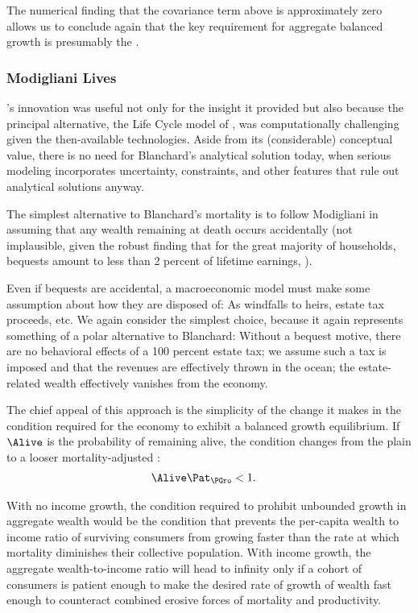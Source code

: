 \documentclass[BufferStockTheory]{subfiles}
\begin{document}
The numerical finding that the covariance term above is approximately zero allows us to conclude again that the key requirement for aggregate balanced growth is presumably the {\GICRaw}.

\hypertarget{Modigliani-Lives}{}
\subsubsection{Modigliani Lives}

\cite{blanchardFinite}'s innovation was useful not only for the insight it provided but also because the principal alternative, the Life Cycle model of \cite{modiglianiWealth}, was computationally challenging given the then-available technologies. Aside from its (considerable) conceptual value, there is no need for Blanchard's analytical solution today, when serious modeling incorporates uncertainty, constraints, and other features that rule out analytical solutions anyway.  %

The simplest alternative to Blanchard's mortality is to follow Modigliani in assuming that any wealth remaining at death occurs accidentally (not implausible, given the robust finding that for the great majority of households, bequests amount to less than 2 percent of lifetime earnings, \cite{hendricksBequests,hendricksSmallBequests}).

Even if bequests are accidental, a macroeconomic model must make some assumption about how they are disposed of: As windfalls to heirs, estate tax proceeds, etc. We again consider the simplest choice, because it again represents something of a polar alternative to Blanchard: Without a bequest motive, there are no behavioral effects of a 100 percent estate tax; we assume such a tax is imposed and that the revenues are effectively thrown in the ocean; the estate-related wealth effectively vanishes from the economy.

The chief appeal of this approach is the simplicity of the change it makes in the condition required for the economy to exhibit a balanced growth equilibrium.  If $\Alive$ is the probability of remaining alive, the condition changes from the plain {\GIC} to a looser mortality-adjusted {\GIC}:
\hypertarget{GICMrt}{}
\begin{align}
  \Alive  \Pat_{\PGro} & < 1. \label{eq:GICMrt}
\end{align}

With no income growth, the condition required to prohibit unbounded growth in aggregate wealth would be the condition that prevents the per-capita wealth to income ratio of surviving consumers from growing faster than the rate at which mortality diminishes their collective population.  With income growth, the aggregate wealth-to-income ratio will head to infinity only if a cohort of consumers is patient enough to make the desired rate of growth of wealth fast enough to counteract combined erosive forces of mortality and productivity.
\end{document}
